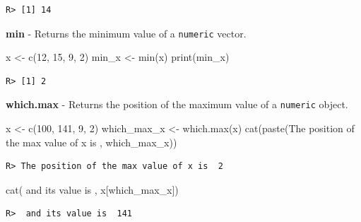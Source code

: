 \documentclass[
  12pt,
]{book}
\newenvironment{Shaded}{\begin{snugshade}}{\end{snugshade}}
\newcommand{\DecValTok}[1]{\textcolor[rgb]{0.06,0.06,0.06}{#1}}
\newcommand{\FunctionTok}[1]{\textcolor[rgb]{0,0,0}{#1}}
\newcommand{\NormalTok}[1]{#1}
\newcommand{\OtherTok}[1]{\textcolor[rgb]{0.37,0.37,0.37}{#1}}
\newcommand{\StringTok}[1]{\textcolor[rgb]{0.5,0.5,0.5}{#1}}
\begin{document}
\begin{verbatim}
R> [1] 14
\end{verbatim}

\textbf{min} - Returns the minimum value of a \texttt{numeric} vector. 

\begin{Shaded}
\begin{Highlighting}[]
\NormalTok{x }\OtherTok{\textless{}{-}} \FunctionTok{c}\NormalTok{(}\DecValTok{12}\NormalTok{, }\DecValTok{15}\NormalTok{, }\DecValTok{9}\NormalTok{, }\DecValTok{2}\NormalTok{)}
\NormalTok{min\_x }\OtherTok{\textless{}{-}} \FunctionTok{min}\NormalTok{(x)}
\FunctionTok{print}\NormalTok{(min\_x)}
\end{Highlighting}
\end{Shaded}

\begin{verbatim}
R> [1] 2
\end{verbatim}

\textbf{which.max} - Returns the position of the maximum value of a \texttt{numeric} object. 

\begin{Shaded}
\begin{Highlighting}[]
\NormalTok{x }\OtherTok{\textless{}{-}} \FunctionTok{c}\NormalTok{(}\DecValTok{100}\NormalTok{, }\DecValTok{141}\NormalTok{, }\DecValTok{9}\NormalTok{, }\DecValTok{2}\NormalTok{)}
\NormalTok{which\_max\_x }\OtherTok{\textless{}{-}} \FunctionTok{which.max}\NormalTok{(x)}
\FunctionTok{cat}\NormalTok{(}\FunctionTok{paste}\NormalTok{(}\StringTok{\textquotesingle{}The position of the max value of x is \textquotesingle{}}\NormalTok{, }
\NormalTok{          which\_max\_x))}
\end{Highlighting}
\end{Shaded}

\begin{verbatim}
R> The position of the max value of x is  2
\end{verbatim}

\begin{Shaded}
\begin{Highlighting}[]
\FunctionTok{cat}\NormalTok{(}\StringTok{\textquotesingle{} and its value is \textquotesingle{}}\NormalTok{, x[which\_max\_x])}
\end{Highlighting}
\end{Shaded}

\begin{verbatim}
R>  and its value is  141
\end{verbatim}
\end{document}

